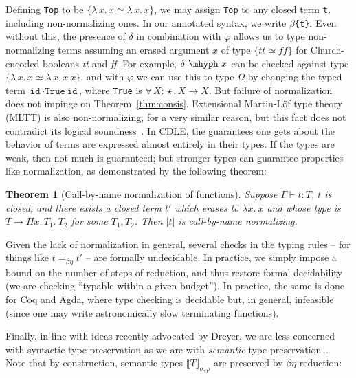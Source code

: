 \documentclass{article}
\newcommand{\abs}[4]{{#1}\, #2\! : \! #3.\, #4}
\newcommand{\absu}[3]{{#1}\, #2.\, #3}
\newcommand{\interp}[1]{\llbracket #1 \rrbracket}
\newtheorem{theorem}{Theorem}
\begin{document}
Defining \verb|Top| to be $\{\absu{\lambda}{x}{x} \simeq
\absu{\lambda}{x}{x}\}$, we may assign \verb|Top| to any closed term \verb|t|,
including non-normalizing ones. In our annotated syntax, we write
\texttt{\(\beta\)\{t\}}. Even without this, the presence of $\delta$ in
combination with $\varphi$ allows us to type non-normalizing terms assuming an
erased argument $x$ of type $\{ \textit{tt} \simeq \textit{ff} \}$ for
Church-encoded booleans \textit{tt} and \textit{ff}. For example, $\delta\
\mhyph\ x$ can be checked against type \(\{\absu{\lambda}{x}{x} \simeq
\absu{\lambda}{x}{x\ x}\}\), and with 
$\varphi$ we can use this to type $\Omega$ by changing the typed term
\(\texttt{id}\ \cdot\texttt{True}\ \texttt{id}\), where \verb|True| is
\(\abs{\forall}{X}{\star}{X \to X}\). But failure of normalization does not
impinge on Theorem~\ref{thm:consis}. Extensional Martin-L\"of type theory (MLTT)
is also non-normalizing, for a very similar reason, but this fact does not contradict
its logical soundness~\cite{dybjer16}. In CDLE, the guarantees one gets about
the behavior of terms are expressed almost entirely in their types. If the types
are weak, then not much is guaranteed; but stronger types can guarantee
properties like normalization, as demonstrated by the following theorem:

\begin{theorem}[Call-by-name normalization of functions]
  \label{thm:cedille-termination}
  Suppose \(\Gamma\vdash t : T\), $t$ is closed, and there exists a closed term
  $t'$ which erases to \(\lambda x.\ x\) and whose type is $T \to \Pi x : T_1.\
  T_2$ for some $T_1, T_2$. Then $|t|$ is call-by-name normalizing.
  \end{theorem}

Given the lack of normalization in general, several checks in the typing rules --
for things like $t =_{\beta\eta} t'$ -- are formally undecidable.  In
practice, we simply impose a bound on the number of steps of reduction,
and thus restore formal decidability (we are checking ``typable within
a given budget'').  In practice, the same is done for Coq and Agda,
where type checking is decidable but, in general, infeasible (since one
may write astronomically slow terminating functions).

Finally, in line with ideas recently advocated by Dreyer, we
are less concerned with syntactic
type preservation as we are with \emph{semantic} type
preservation~\cite{dreyer18}.
Note that by construction, semantic types $\interp{T}_{\sigma,\rho}$ are
preserved by $\beta\eta$-reduction:
\end{document}
